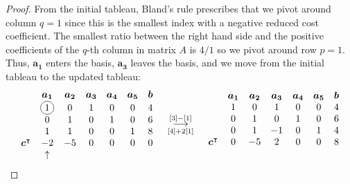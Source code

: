 \documentclass[12pt]{article}
\newcommand*\circled[1]{\tikz[baseline=(char.base)]{
            \node[shape=circle,draw,inner sep=2pt] (char) {#1};}}
\theoremstyle{definition}
\newcommand{\vect}[1]{\boldsymbol{#1}}
\newcommand{\grstep}[2][\relax]{%
   \ensuremath{\mathrel{
       {\mathop{\longrightarrow}\limits^{#2\mathstrut}_{
                                     \begin{subarray}{l} #1 \end{subarray}}}}}}
\begin{document}
\begin{proof}
  From the initial tableau, Bland's rule prescribes that we pivot around column
  $q=1$ since this is the smallest index with a negative reduced cost coefficient.
  The smallest ratio between the right hand side and the positive coefficients
  of the $q$-th column in matrix $A$ is $4/1$ so we pivot around row $p =1$. Thus, $\vect{a_1}$
  enters the basis, $\vect{a_3}$ leaves the basis, and we move from the initial tableau to the updated tableau:
  \begin{align*}
    \begin{matrix}
      & \vect{a_1} & \vect{a_2} & \vect{a_3} & \vect{a_4} & \vect{a_5} & \vect{b} \\
      & \circled{1} & 0 & 1 & 0 & 0 & 4 \\
      & 0 & 1 & 0 & 1 & 0 & 6 \\
      & 1 & 1 & 0 & 0 & 1 & 8 \\
      \vect{c}^\intercal & -2 & -5  & 0 & 0 & 0 & 0 \\
      & \uparrow & & & & & \\
    \end{matrix}
    \quad
    \begin{array}{c}
    \grstep[{[4] + 2[1]}]{[3] - [1]} \\
    \end{array}
    \quad
    \begin{matrix}
      & \vect{a_1} & \vect{a_2} & \vect{a_3} & \vect{a_4} & \vect{a_5} & \vect{b} \\
                       & 1 & 0 & 1 & 0 & 0 & 4 \\
                       & 0 & 1 & 0 & 1 & 0 & 6 \\
                       & 0 & 1 & -1 & 0 & 1 & 4 \\
      \vect{c}^\intercal & 0 & -5 & 2 & 0 & 0 & 8 \\
      & & & & & & \\
    \end{matrix}
  \end{align*}


\end{proof}
\end{document}
